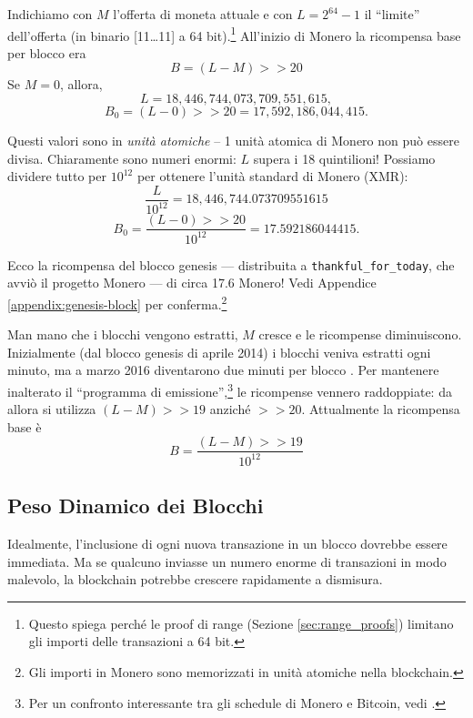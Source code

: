 Indichiamo con $M$ l’offerta di moneta attuale e con $L = 2^{64}-1$ il “limite” dell’offerta (in binario [11…11] a 64 bit).\footnote{Questo spiega perché le proof di range (Sezione \ref{sec:range_proofs}) limitano gli importi delle transazioni a 64 bit.} All’inizio di Monero la ricompensa base per blocco era
\[B = (L - M) >> 20\]
Se $M = 0$, allora,\vspace{.175cm}
\[L = 18{,}446{,}744{,}073{,}709{,}551{,}615,\]
\[B_0 = (L - 0) >> 20 = 17{,}592{,}186{,}044{,}415.\]

Questi valori sono in \emph{unità atomiche} – 1 unità atomica di Monero non può essere divisa. Chiaramente sono numeri enormi: $L$ supera i 18 quintilioni! Possiamo dividere tutto per $10^{12}$ per ottenere l’unità standard di Monero (XMR):\vspace{.15cm}
\[\frac{L}{10^{12}} = 18{,}446{,}744.073709551615\]
\[B_0 = \frac{(L - 0) >> 20}{10^{12}} = 17.592186044415.\]

Ecco la ricompensa del blocco genesis — distribuita a \texttt{thankful\_for\_today}, che avviò il progetto Monero \cite{bitmonero-launched} — di circa 17.6 Monero! Vedi Appendice \ref{appendix:genesis-block} per conferma.\footnote{Gli importi in Monero sono memorizzati in unità atomiche nella blockchain.}

Man mano che i blocchi vengono estratti, $M$ cresce e le ricompense diminuiscono. Inizialmente (dal blocco genesis di aprile 2014) i blocchi veniva estratti ogni minuto, ma a marzo 2016 diventarono due minuti per blocco \cite{monero-0.9.3}. Per mantenere inalterato il “programma di emissione”,\footnote{Per un confronto interessante tra gli schedule di Monero e Bitcoin, vedi \cite{monero-coin-emission}.} le ricompense vennero raddoppiate: da allora si utilizza $(L - M) >> 19$ anziché $>> 20$. Attualmente la ricompensa base è\vspace{.175cm}
\[B = \frac{(L - M) >> 19}{10^{12}}\]


\subsection{Peso Dinamico dei Blocchi}
\label{subsec:dynamic-block-weight}

Idealmente, l'inclusione di ogni nuova transazione in un blocco dovrebbe essere immediata. Ma se qualcuno inviasse un numero enorme di transazioni in modo malevolo, la blockchain potrebbe crescere rapidamente a dismisura.

